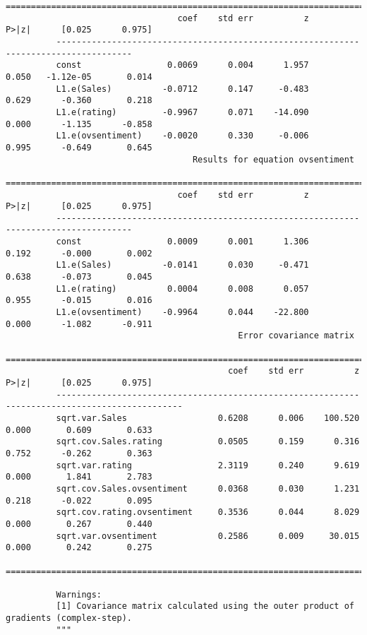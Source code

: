\documentclass[11pt]{article}
\begin{document}
\begin{Verbatim}[commandchars=\\\{\}]
          =====================================================================================
                                  coef    std err          z      P>|z|      [0.025      0.975]
          -------------------------------------------------------------------------------------
          const                 0.0069      0.004      1.957      0.050   -1.12e-05       0.014
          L1.e(Sales)          -0.0712      0.147     -0.483      0.629      -0.360       0.218
          L1.e(rating)         -0.9967      0.071    -14.090      0.000      -1.135      -0.858
          L1.e(ovsentiment)    -0.0020      0.330     -0.006      0.995      -0.649       0.645
                                     Results for equation ovsentiment                          
          =====================================================================================
                                  coef    std err          z      P>|z|      [0.025      0.975]
          -------------------------------------------------------------------------------------
          const                 0.0009      0.001      1.306      0.192      -0.000       0.002
          L1.e(Sales)          -0.0141      0.030     -0.471      0.638      -0.073       0.045
          L1.e(rating)          0.0004      0.008      0.057      0.955      -0.015       0.016
          L1.e(ovsentiment)    -0.9964      0.044    -22.800      0.000      -1.082      -0.911
                                              Error covariance matrix                                    
          ===============================================================================================
                                            coef    std err          z      P>|z|      [0.025      0.975]
          -----------------------------------------------------------------------------------------------
          sqrt.var.Sales                  0.6208      0.006    100.520      0.000       0.609       0.633
          sqrt.cov.Sales.rating           0.0505      0.159      0.316      0.752      -0.262       0.363
          sqrt.var.rating                 2.3119      0.240      9.619      0.000       1.841       2.783
          sqrt.cov.Sales.ovsentiment      0.0368      0.030      1.231      0.218      -0.022       0.095
          sqrt.cov.rating.ovsentiment     0.3536      0.044      8.029      0.000       0.267       0.440
          sqrt.var.ovsentiment            0.2586      0.009     30.015      0.000       0.242       0.275
          ===============================================================================================
          
          Warnings:
          [1] Covariance matrix calculated using the outer product of gradients (complex-step).
          """
\end{Verbatim}
            
\end{document}
